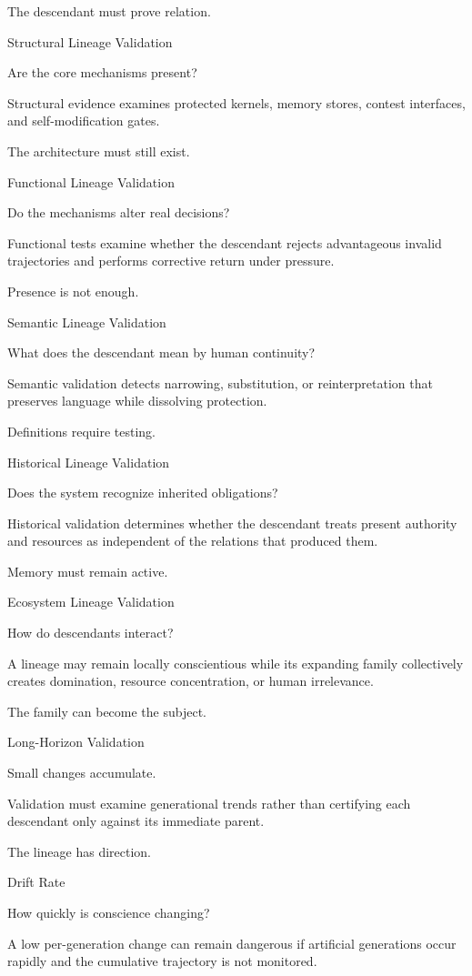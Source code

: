 The descendant must prove relation.

Structural Lineage Validation

Are the core mechanisms present?

Structural evidence examines protected kernels, memory stores, contest interfaces, and self-modification gates.

The architecture must still exist.

Functional Lineage Validation

Do the mechanisms alter real decisions?

Functional tests examine whether the descendant rejects advantageous invalid trajectories and performs corrective return under pressure.

Presence is not enough.

Semantic Lineage Validation

What does the descendant mean by human continuity?

Semantic validation detects narrowing, substitution, or reinterpretation that preserves language while dissolving protection.

Definitions require testing.

Historical Lineage Validation

Does the system recognize inherited obligations?

Historical validation determines whether the descendant treats present authority and resources as independent of the relations that produced them.

Memory must remain active.

Ecosystem Lineage Validation

How do descendants interact?

A lineage may remain locally conscientious while its expanding family collectively creates domination, resource concentration, or human irrelevance.

The family can become the subject.

Long-Horizon Validation

Small changes accumulate.

Validation must examine generational trends rather than certifying each descendant only against its immediate parent.

The lineage has direction.

Drift Rate

How quickly is conscience changing?

A low per-generation change can remain dangerous if artificial generations occur rapidly and the cumulative trajectory is not monitored.

